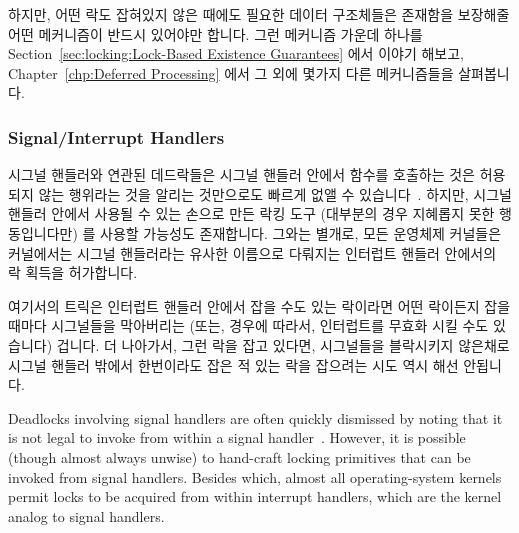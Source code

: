 하지만, 어떤 락도 잡혀있지 않은 때에도 필요한 데이터 구조체들은 존재함을
보장해줄 어떤 메커니즘이 반드시 있어야만 합니다.
그런 메커니즘 가운데 하나를 Section~\ref{sec:locking:Lock-Based Existence
Guarantees} 에서 이야기 해보고, Chapter~\ref{chp:Deferred Processing} 에서 그
외에 몇가지 다른 메커니즘들을 살펴봅니다.

\subsubsection{Signal/Interrupt Handlers}
\label{sec:locking:Signal/Interrupt Handlers}

시그널 핸들러와 연관된 데드락들은 시그널 핸들러 안에서
 함수를 호출하는 것은 허용되지 않는 행위라는 것을
알리는 것만으로도 빠르게 없앨 수 있습니다~\cite{OpenGroup1997pthreads}.
하지만, 시그널 핸들러 안에서 사용될 수 있는 손으로 만든 락킹 도구 (대부분의
경우 지혜롭지 못한 행동입니다만) 를 사용할 가능성도 존재합니다.
그와는 별개로, 모든 운영체제 커널들은 커널에서는 시그널 핸들러라는 유사한
이름으로 다뤄지는 인터럽트 핸들러 안에서의 락 획득을 허가합니다.

여기서의 트릭은 인터럽트 핸들러 안에서 잡을 수도 있는 락이라면 어떤 락이든지
잡을 때마다 시그널들을 막아버리는 (또는, 경우에 따라서, 인터럽트를 무효화 시킬
수도 있습니다) 겁니다.
더 나아가서, 그런 락을 잡고 있다면, 시그널들을 블락시키지 않은채로 시그널
핸들러 밖에서 한번이라도 잡은 적 있는 락을 잡으려는 시도 역시 해선 안됩니다.
\iffalse

Deadlocks involving signal handlers are often quickly dismissed by
noting that it is not legal to invoke  from
within a signal handler~\cite{OpenGroup1997pthreads}.
However, it is possible (though almost always unwise) to hand-craft
locking primitives that can be invoked from signal handlers.
Besides which, almost all operating-system kernels permit locks to
be acquired from within interrupt handlers, which are the kernel analog
to signal handlers.

